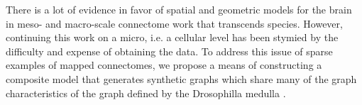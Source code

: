 \documentclass[11]{article}
\newcommand{\sanote}{\todo[color=violet!30]}
\theoremstyle{remark}
\theoremstyle{definition}
\begin{document}
There is a lot of evidence in favor of spatial and geometric models for the brain in meso- and macro-scale connectome work \cite{spatialagainst,connectometutorial, spatialfor} that transcends species. However, continuing this work on a micro, i.e. a cellular level has been stymied by the difficulty and expense of obtaining the data. To address this issue of sparse examples of mapped connectomes, we propose a means of constructing a composite model that generates synthetic graphs which share many of the graph characteristics of the graph defined by the Drosophilla medulla \cite{naturenetwork}.


\end{document}

